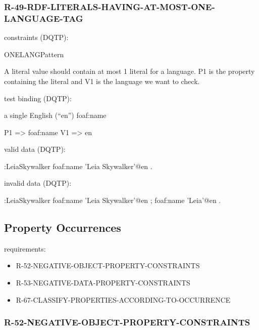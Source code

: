 \documentclass{llncs}
\begin{document}
\subsubsection{R-49-RDF-LITERALS-HAVING-AT-MOST-ONE-LANGUAGE-TAG} 

constraints (DQTP):

ONELANGPattern \cite{Kontokostas2014} 

A literal value should contain at most
1 literal for a language. P1 is the property containing the
literal and V1 is the language we want to check.


test binding (DQTP):

a single English (“en”) foaf:name

\begin{ex}
P1 => foaf:name
V1 => en
\end{ex}

valid data (DQTP):

\begin{ex}
:LeiaSkywalker
    foaf:name 'Leia Skywalker'@en .
\end{ex}

invalid data (DQTP):

\begin{ex}
:LeiaSkywalker
    foaf:name 'Leia Skywalker'@en ;
    foaf:name 'Leia'@en .
\end{ex}

\subsection{Property Occurrences}

requirements:

\begin{itemize}
	\item R-52-NEGATIVE-OBJECT-PROPERTY-CONSTRAINTS
	\item R-53-NEGATIVE-DATA-PROPERTY-CONSTRAINTS
	\item R-67-CLASSIFY-PROPERTIES-ACCORDING-TO-OCCURRENCE
\end{itemize}

\subsubsection{R-52-NEGATIVE-OBJECT-PROPERTY-CONSTRAINTS}
\end{document}

